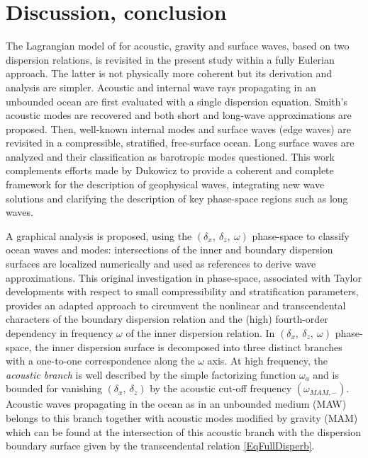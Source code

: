 \section{Discussion, conclusion}
\label{SectionDiscussion}
The Lagrangian model of \cite{dukowicz_2013} for acoustic, gravity and surface waves, based on two dispersion relations, is revisited in the present study within a fully Eulerian approach. The latter is not physically more coherent but its derivation and analysis are simpler. Acoustic and internal wave rays propagating in an unbounded ocean are first evaluated with a single dispersion equation. Smith's acoustic modes \citep{smith_2015} are recovered and both short and long-wave approximations are proposed. Then, well-known internal modes and surface waves (edge waves) are revisited in a compressible, stratified, free-surface ocean. Long surface waves are analyzed and their classification as barotropic modes questioned. This work complements efforts made by Dukowicz to provide a coherent and complete framework for the description of geophysical waves, integrating new wave solutions and clarifying the description of key phase-space regions such as long waves.

A graphical analysis is proposed, using the $(\delta_x,\ \delta_z,\ \omega)$ phase-space to classify ocean waves and modes: intersections of the inner and boundary dispersion surfaces are localized numerically and used as references to derive wave approximations. This original investigation in phase-space, associated with Taylor developments with respect to small compressibility and stratification parameters, provides an adapted approach to circumvent the nonlinear and transcendental characters of the boundary dispersion relation and the (high) fourth-order dependency in frequency $\omega$ of the inner dispersion relation. In $(\delta_x,\ \delta_z,\ \omega)$ phase-space, the inner dispersion surface is decomposed into three distinct branches with a one-to-one correspondence along the $\omega$ axis. At high frequency, the \textit{acoustic branch} is well described by the simple factorizing function $\omega_a$ and is bounded for vanishing $(\delta_x,\ \delta_z)$ by the acoustic cut-off frequency $(\omega_{MAM,-})$. Acoustic waves propagating in the ocean as in an unbounded medium (MAW) belongs to this branch together with acoustic modes modified by gravity (MAM) which can be found at the intersection of this acoustic branch with the dispersion boundary surface given by the transcendental relation \ref{EqFullDisperb}.

